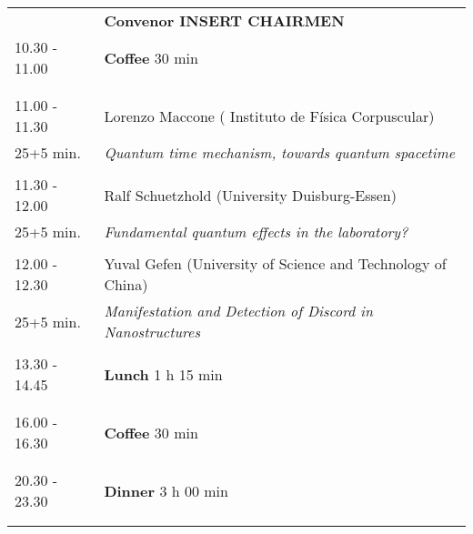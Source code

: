 \begin{longtable}{p{3cm}p{13cm}}
&\hfill {\bf Convenor INSERT CHAIRMEN }\\ 
10.30 - 11.00 & {\bf Coffee} \hfill 30 min \\ 
 & \\ 
 & \\ 
11.00 - 11.30 & Lorenzo Maccone ( Instituto de Física Corpuscular)\\ 
25+5 min. & {\it Quantum time mechanism, towards quantum spacetime}\\ 
 & \\ 
11.30 - 12.00 & Ralf Schuetzhold (University Duisburg-Essen)\\ 
25+5 min. & {\it Fundamental quantum effects in the laboratory?}\\ 
 & \\ 
12.00 - 12.30 & Yuval Gefen (University of Science and Technology of China)\\ 
25+5 min. & {\it Manifestation and Detection of Discord in Nanostructures}\\ 
 & \\ 
13.30 - 14.45 & {\bf Lunch} \hfill 1 h 15 min \\ 
 & \\ 
 & \\ 
16.00 - 16.30 & {\bf Coffee} \hfill 30 min \\ 
 & \\ 
 & \\ 
20.30 - 23.30 & {\bf Dinner} \hfill 3 h 00 min \\ 
 & \\ 
 & \\ 
\end{longtable}

